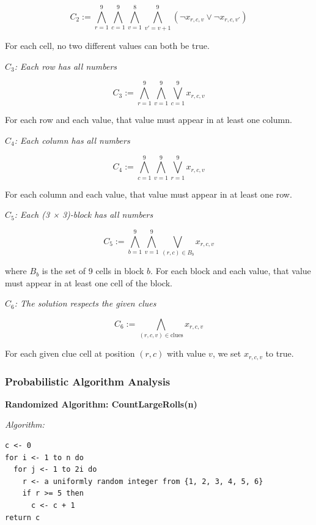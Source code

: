\documentclass{article}
\theoremstyle{theorem}
\theoremstyle{definition}
\theoremstyle{remark}
\begin{document}
\[
C_2 := \bigwedge_{r=1}^{9} \bigwedge_{c=1}^{9} \bigwedge_{v=1}^{8} \bigwedge_{v'=v+1}^{9} (\neg x_{r,c,v} \lor \neg x_{r,c,v'})
\]

For each cell, no two different values can both be true.

\vspace{0.2cm}
\textit{$C_3$: Each row has all numbers}

\[
C_3 := \bigwedge_{r=1}^{9} \bigwedge_{v=1}^{9} \bigvee_{c=1}^{9} x_{r,c,v}
\]

For each row and each value, that value must appear in at least one column.

\vspace{0.2cm}
\textit{$C_4$: Each column has all numbers}

\[
C_4 := \bigwedge_{c=1}^{9} \bigwedge_{v=1}^{9} \bigvee_{r=1}^{9} x_{r,c,v}
\]

For each column and each value, that value must appear in at least one row.

\vspace{0.2cm}
\textit{$C_5$: Each (3 × 3)-block has all numbers}

\[
C_5 := \bigwedge_{b=1}^{9} \bigwedge_{v=1}^{9} \bigvee_{(r,c) \in B_b} x_{r,c,v}
\]

where $B_b$ is the set of 9 cells in block $b$. For each block and each value, that value must appear in at least one cell of the block.

\vspace{0.2cm}
\textit{$C_6$: The solution respects the given clues}

\[
C_6 := \bigwedge_{(r,c,v) \in \text{clues}} x_{r,c,v}
\]

For each given clue cell at position $(r, c)$ with value $v$, we set $x_{r,c,v}$ to true.

\vspace{0.3cm}

\subsubsection{Probabilistic Algorithm Analysis}

\textbf{Randomized Algorithm: CountLargeRolls(n)}

\textit{Algorithm:}
\begin{verbatim}
c <- 0
for i <- 1 to n do
  for j <- 1 to 2i do
    r <- a uniformly random integer from {1, 2, 3, 4, 5, 6}
    if r >= 5 then
      c <- c + 1
return c
\end{verbatim}
\end{document}
